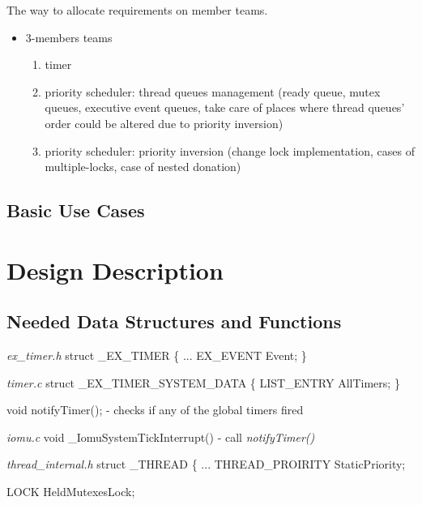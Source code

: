 The way to allocate requirements on member teams. 
\begin{itemize}
    \item 3-members teams
        \begin{enumerate}
            \item timer 
            
            \item priority scheduler: thread queues management (ready queue, mutex queues, executive event queues, take care of places where thread queues' order could be altered due to priority inversion)
            
            \item priority scheduler: priority inversion (change lock implementation, cases of multiple-locks, case of nested donation)
            
        \end{enumerate}

\end{itemize}



\subsection{Basic Use Cases}



\section{Design Description}

\subsection{Needed Data Structures and Functions}

\textit{ex_timer.h}
struct _EX_TIMER \{
	...
	EX_EVENT Event;
\}

\textit{timer.c}
struct _EX_TIMER_SYSTEM_DATA \{
	LIST_ENTRY AllTimers;
\}

void notifyTimer();
	- checks if any of the global timers fired

\textit{iomu.c}
void _IomuSystemTickInterrupt()
	- call \textit{notifyTimer()}

\textit{thread_internal.h}
struct _THREAD \{
	...
	THREAD_PROIRITY StaticPriority;

	LOCK HeldMutexesLock;

